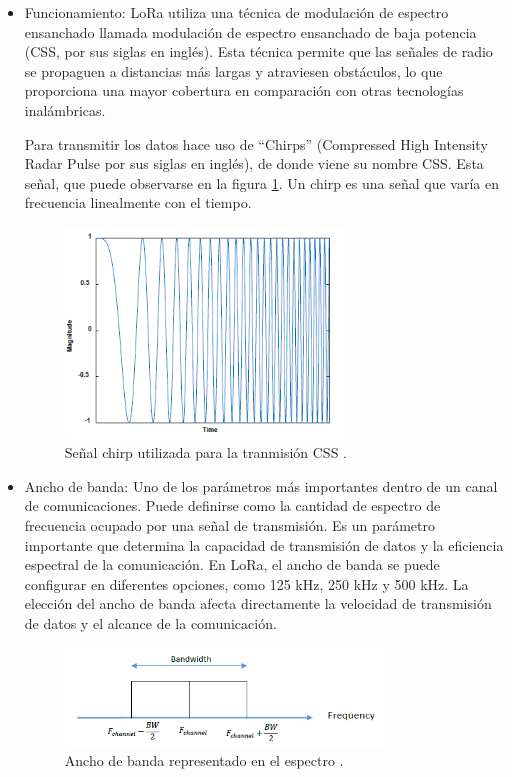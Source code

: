 \begin{itemize}
    \item Funcionamiento: LoRa utiliza una técnica de modulación de espectro ensanchado llamada modulación de espectro ensanchado de baja potencia (CSS, por sus siglas en inglés). Esta técnica permite que las señales de radio se propaguen a distancias más largas y atraviesen obstáculos, lo que proporciona una mayor cobertura en comparación con otras tecnologías inalámbricas.
    
    Para transmitir los datos hace uso de ``Chirps'' (Compressed High Intensity Radar Pulse por sus siglas en inglés), de donde viene su nombre CSS. Esta señal, que puede observarse en la figura \ref{fig:chirp}. Un chirp es una señal que varía en frecuencia linealmente con el tiempo.

    \begin{figure}[H]
        \centering
        \includegraphics[width = 0.7\textwidth]{imagenes/cap1_marcoteo/ChripSignal.png}
        \caption{Señal chirp utilizada para la tranmisión CSS \citep{aloufi2020hybrid}.}
        \label{fig:chirp}
    \end{figure}

    \item Ancho de banda: Uno de los parámetros más importantes dentro de un canal de comunicaciones. Puede definirse como la cantidad de espectro de frecuencia ocupado por una señal de transmisión. Es un parámetro importante que determina la capacidad de transmisión de datos y la eficiencia espectral de la comunicación. En LoRa, el ancho de banda se puede configurar en diferentes opciones, como 125 kHz, 250 kHz y 500 kHz. La elección del ancho de banda afecta directamente la velocidad de transmisión de datos y el alcance de la comunicación.
    
    \begin{figure}[H]
        \centering
        \includegraphics[width = 0.8\textwidth]{imagenes/cap1_marcoteo/AnchodeBandaLoRa.png}
        \caption{Ancho de banda representado en el espectro \citep{aloufi2020hybrid}.}
        \label{fig:anchobanda}
    \end{figure}


\end{itemize}

